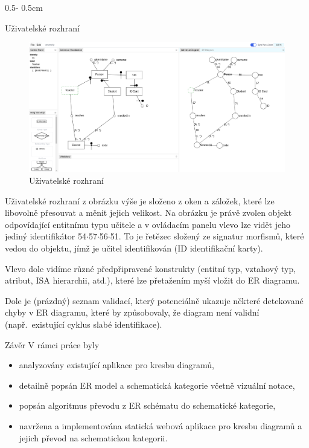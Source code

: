 \documentclass[a0paper]{uioposter}
\begin{document}
\begin{frame}
\begin{columns}[onlytextwidth]
    \begin{column}{0.5\textwidth - 0.5cm}
      \begin{block}{Uživatelské rozhraní}
        \begin{figure}
          \centering
          \includegraphics[width=\textwidth]{./images/identifier-screenshot.png}
          \caption*{Uživatelské rozhraní}
          \label{fig:user-interface}
        \end{figure}

        Uživatelské rozhraní z obrázku výše je složeno z oken a záložek, které lze libovolně přesouvat a měnit jejich velikost.
        Na obrázku je právě zvolen objekt odpovídající entitnímu typu učitele a v ovládacím panelu vlevo lze vidět jeho jediný identifikátor 54$\cdot$57$\cdot$56$\cdot$51.
        To je řetězec složený ze signatur morfismů, které vedou do objektu, jímž je učitel identifikován (ID identifikační karty).

        Vlevo dole vidíme různé předpřipravené konstrukty (entitní typ, vztahový typ, atribut, ISA hierarchii, atd.), které lze přetažením myší vložit do ER diagramu.

        Dole je (prázdný) seznam validací, který potenciálně ukazuje některé detekované chyby v ER diagramu, které by způsobovaly, že diagram není validní (např.~existující cyklus slabé identifikace).
      \end{block}
      \begin{block}{Závěr}
          V rámci práce byly
          \begin{itemize}
              \item analyzovány existující aplikace pro kresbu diagramů,
              \item detailně popsán ER model a schematická kategorie včetně vizuální notace,
              \item popsán algoritmus převodu z ER schématu do schematické kategorie,
              \item navržena a implementována statická webová aplikace pro kresbu diagramů a jejich převod na schematickou kategorii.
          \end{itemize}


\end{block}
\end{column}
\end{columns}
\end{frame}
\end{document}
